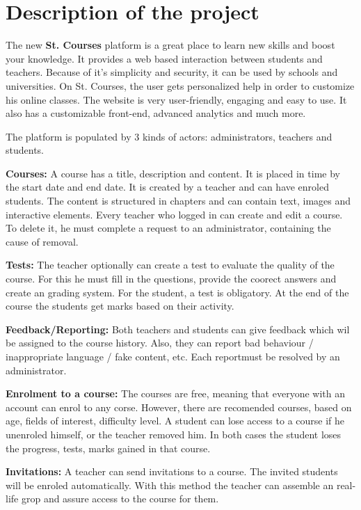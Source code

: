\documentclass[12pt,a4paper,titlepage]{article}
\begin{document}
\section{Description of the project}
The new \textbf{St. Courses} platform is a great place to learn new skills and boost your knowledge. It provides a web based interaction between students and teachers. Because of it's simplicity and security, it can be used by schools and universities. On St. Courses, the user gets personalized help in order to customize his online classes.
The website is very user-friendly, engaging and easy to use. It also has a customizable front-end, advanced analytics and much more.

The platform is populated by 3 kinds of actors: administrators, teachers and students.

\textbf{Courses:}
A course has a title, description and content. It is placed in time by the start date and end date. It is created by a teacher and can have enroled students.
The content is structured in chapters and can contain text, images and interactive elements.
Every teacher who logged in can create and edit a course. To delete it, he must complete a request to an administrator, containing the cause of removal.

\textbf{Tests:}
The teacher optionally can create a test to evaluate the quality of the course. For this he must fill in the questions, provide the coorect answers and create an grading system.
For the student, a test is obligatory. At the end of the course the students get marks based on their activity.

\textbf{Feedback/Reporting:}
Both teachers and students can give feedback which wil be assigned to the course history. Also, they can report bad behaviour / inappropriate language / fake content, etc. Each reportmust be resolved by an administrator.

\textbf{Enrolment to a course:}
The courses are free, meaning that everyone with an account can enrol to any corse. However, there are recomended courses, based on age, fields of interest, difficulty level.
A student can lose access to a course if he unenroled himself, or the teacher removed him.
In both cases the student loses the progress, tests, marks gained in that course.

\textbf{Invitations:}
A teacher can send invitations to a course. The invited students will be enroled automatically. With this method the teacher can assemble an real-life grop and assure access to the course for them.
\end{document}
